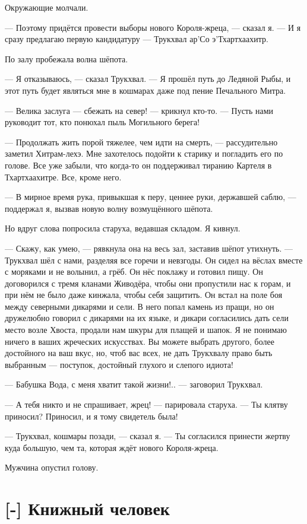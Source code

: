 Окружающие молчали.

--- Поэтому придётся провести выборы нового Короля-жреца, --- сказал я.
--- И я сразу предлагаю первую кандидатуру --- Трукхвал ар'Со э'Тхартхаахитр.

По залу пробежала волна шёпота.

--- Я отказываюсь, --- сказал Трукхвал.
--- Я прошёл путь до Ледяной Рыбы, и этот путь будет являться мне в кошмарах даже под пение Печального Митра.

--- Велика заслуга --- сбежать на север! --- крикнул кто-то.
--- Пусть нами руководит тот, кто понюхал пыль Могильного берега!

--- Продолжать жить порой тяжелее, чем идти на смерть, --- рассудительно заметил Хитрам-лехэ.
Мне захотелось подойти к старику и погладить его по голове.
Все уже забыли, что когда-то он поддерживал тиранию Картеля в Тхартхаахитре.
Все, кроме него.

--- В мирное время рука, привыкшая к перу, ценнее руки, державшей саблю, --- поддержал я, вызвав новую волну возмущённого шёпота.

Но вдруг слова попросила старуха, ведавшая складом.
Я кивнул.

--- Скажу, как умею, --- рявкнула она на весь зал, заставив шёпот утихнуть.
--- Трукхвал шёл с нами, разделяя все горечи и невзгоды.
Он сидел на вёслах вместе с моряками и не волынил, а грёб.
Он нёс поклажу и готовил пищу.
Он договорился с тремя кланами Живодёра, чтобы они пропустили нас к горам, и при нём не было даже кинжала, чтобы себя защитить.
Он встал на поле боя между северными дикарями и сели.
В него попал камень из пращи, но он дружелюбно говорил с дикарями на их языке, и дикари согласились дать сели место возле Хвоста, продали нам шкуры для плащей и шапок.
Я не понимаю ничего в ваших жреческих искусствах.
Вы можете выбрать другого, более достойного на ваш вкус, но, чтоб вас всех, не дать Трукхвалу право быть выбранным --- поступок, достойный глухого и слепого идиота!

--- Бабушка Вода, с меня хватит такой жизни!.. --- заговорил Трукхвал.

--- А тебя никто и не спрашивает, жрец! --- парировала старуха.
--- Ты клятву приносил?
Приносил, и я тому свидетель была!

--- Трукхвал, кошмары позади, --- сказал я.
--- Ты согласился принести жертву куда большую, чем та, которая ждёт нового Короля-жреца.

Мужчина опустил голову.

\section{[-] Книжный человек}

